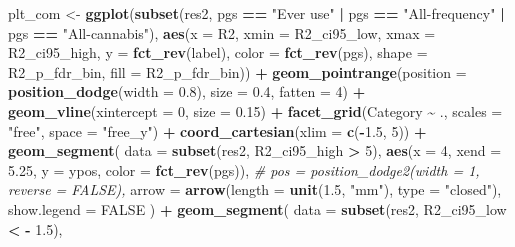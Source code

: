 \documentclass[
]{article}
\newenvironment{Shaded}{\begin{snugshade}}{\end{snugshade}}
\newcommand{\AttributeTok}[1]{\textcolor[rgb]{0.13,0.29,0.53}{#1}}
\newcommand{\CommentTok}[1]{\textcolor[rgb]{0.56,0.35,0.01}{\textit{#1}}}
\newcommand{\ConstantTok}[1]{\textcolor[rgb]{0.56,0.35,0.01}{#1}}
\newcommand{\DecValTok}[1]{\textcolor[rgb]{0.00,0.00,0.81}{#1}}
\newcommand{\FloatTok}[1]{\textcolor[rgb]{0.00,0.00,0.81}{#1}}
\newcommand{\FunctionTok}[1]{\textcolor[rgb]{0.13,0.29,0.53}{\textbf{#1}}}
\newcommand{\NormalTok}[1]{#1}
\newcommand{\OtherTok}[1]{\textcolor[rgb]{0.56,0.35,0.01}{#1}}
\newcommand{\SpecialCharTok}[1]{\textcolor[rgb]{0.81,0.36,0.00}{\textbf{#1}}}
\newcommand{\StringTok}[1]{\textcolor[rgb]{0.31,0.60,0.02}{#1}}
\begin{document}
\begin{Shaded}
\begin{Highlighting}[]
\NormalTok{plt\_com }\OtherTok{\textless{}{-}} \FunctionTok{ggplot}\NormalTok{(}\FunctionTok{subset}\NormalTok{(res2, pgs }\SpecialCharTok{==} \StringTok{"Ever use"} \SpecialCharTok{|}\NormalTok{ pgs }\SpecialCharTok{==} \StringTok{"All{-}frequency"} \SpecialCharTok{|}\NormalTok{ pgs }\SpecialCharTok{==} \StringTok{"All{-}cannabis"}\NormalTok{), }
                  \FunctionTok{aes}\NormalTok{(}\AttributeTok{x =}\NormalTok{ R2, }\AttributeTok{xmin =}\NormalTok{ R2\_ci95\_low, }\AttributeTok{xmax =}\NormalTok{ R2\_ci95\_high,}
              \AttributeTok{y =} \FunctionTok{fct\_rev}\NormalTok{(label), }\AttributeTok{color =} \FunctionTok{fct\_rev}\NormalTok{(pgs),  }\AttributeTok{shape =}\NormalTok{ R2\_p\_fdr\_bin, }\AttributeTok{fill =}\NormalTok{ R2\_p\_fdr\_bin)) }\SpecialCharTok{+} 
  \FunctionTok{geom\_pointrange}\NormalTok{(}\AttributeTok{position =} \FunctionTok{position\_dodge}\NormalTok{(}\AttributeTok{width =} \FloatTok{0.8}\NormalTok{), }\AttributeTok{size =} \FloatTok{0.4}\NormalTok{, }\AttributeTok{fatten =} \DecValTok{4}\NormalTok{) }\SpecialCharTok{+}
  \FunctionTok{geom\_vline}\NormalTok{(}\AttributeTok{xintercept =} \DecValTok{0}\NormalTok{, }\AttributeTok{size =} \FloatTok{0.15}\NormalTok{) }\SpecialCharTok{+}
  \FunctionTok{facet\_grid}\NormalTok{(Category }\SpecialCharTok{\textasciitilde{}}\NormalTok{ ., }\AttributeTok{scales =} \StringTok{"free"}\NormalTok{, }\AttributeTok{space =} \StringTok{"free\_y"}\NormalTok{) }\SpecialCharTok{+}
  \FunctionTok{coord\_cartesian}\NormalTok{(}\AttributeTok{xlim =} \FunctionTok{c}\NormalTok{(}\SpecialCharTok{{-}}\FloatTok{1.5}\NormalTok{, }\DecValTok{5}\NormalTok{)) }\SpecialCharTok{+}
  \FunctionTok{geom\_segment}\NormalTok{(}
    \AttributeTok{data =} \FunctionTok{subset}\NormalTok{(res2, R2\_ci95\_high }\SpecialCharTok{\textgreater{}} \DecValTok{5}\NormalTok{),}
    \FunctionTok{aes}\NormalTok{(}\AttributeTok{x =} \DecValTok{4}\NormalTok{, }\AttributeTok{xend =} \FloatTok{5.25}\NormalTok{, }\AttributeTok{y =}\NormalTok{  ypos,}
        \AttributeTok{color =} \FunctionTok{fct\_rev}\NormalTok{(pgs)),}
    \CommentTok{\# pos = position\_dodge2(width = 1, reverse = FALSE),}
    \AttributeTok{arrow =} \FunctionTok{arrow}\NormalTok{(}\AttributeTok{length =} \FunctionTok{unit}\NormalTok{(}\FloatTok{1.5}\NormalTok{, }\StringTok{"mm"}\NormalTok{), }\AttributeTok{type =} \StringTok{"closed"}\NormalTok{),}
    \AttributeTok{show.legend =} \ConstantTok{FALSE}
\NormalTok{  ) }\SpecialCharTok{+}
    \FunctionTok{geom\_segment}\NormalTok{(}
    \AttributeTok{data =} \FunctionTok{subset}\NormalTok{(res2, R2\_ci95\_low }\SpecialCharTok{\textless{}} \SpecialCharTok{{-}} \FloatTok{1.5}\NormalTok{),}

\end{Highlighting}
\end{Shaded}
\end{document}
